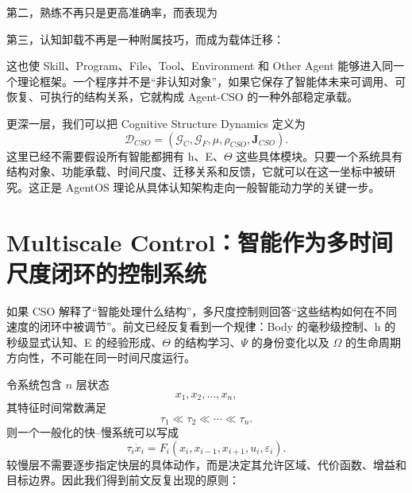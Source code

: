 第二，熟练不再只是更高准确率，而表现为
\begin{statementbox}
\centering
{}
\end{statementbox}

第三，认知卸载不再是一种附属技巧，而成为载体迁移：
\begin{statementbox}
\centering
{}
\end{statementbox}

这也使 Skill、Program、File、Tool、Environment 和 Other Agent 能够进入同一个理论框架。一个程序并不是“非认知对象”，如果它保存了智能体未来可调用、可恢复、可执行的结构关系，它就构成 Agent-CSO 的一种外部稳定承载。

更深一层，我们可以把 Cognitive Structure Dynamics 定义为
\begin{equation}
\boxed{
\mathcal{D}_{CSO}
=
\left(
\mathcal{G}_{C},
\mathcal{G}_{F},
\mu,
\rho_{CSO},
\mathbf{J}_{CSO}
\right).
}
\end{equation}
这里已经不需要假设所有智能都拥有 h、E、$\Theta$ 这些具体模块。只要一个系统具有结构对象、功能承载、时间尺度、迁移关系和反馈，它就可以在这一坐标中被研究。这正是 AgentOS 理论从具体认知架构走向一般智能动力学的关键一步。

\section{Multiscale Control：智能作为多时间尺度闭环的控制系统}

如果 CSO 解释了“智能处理什么结构”，多尺度控制则回答“这些结构如何在不同速度的闭环中被调节”。前文已经反复看到一个规律：Body 的毫秒级控制、h 的秒级显式认知、E 的经验形成、$\Theta$ 的结构学习、$\Psi$ 的身份变化以及 $\Omega$ 的生命周期方向性，不可能在同一时间尺度运行。

令系统包含 $n$ 层状态
\begin{equation}
x_1,x_2,\ldots,x_n,
\end{equation}
其特征时间常数满足
\begin{equation}
\tau_1\ll\tau_2\ll\cdots\ll\tau_n.
\end{equation}
则一个一般化的快--慢系统可以写成
\begin{equation}
\tau_i\dot{x}_i
=
F_i
\left(
x_i,
x_{i-1},
x_{i+1},
u_i,
\varepsilon_i
\right).
\end{equation}
较慢层不需要逐步指定快层的具体动作，而是决定其允许区域、代价函数、增益和目标边界。因此我们得到前文反复出现的原则：
\begin{statementbox}
\centering
{}
\end{statementbox}

